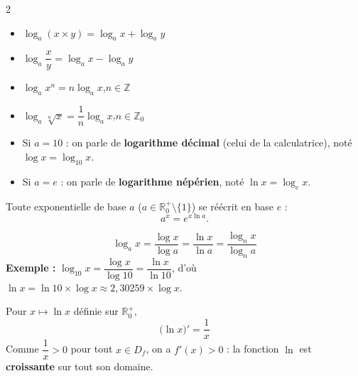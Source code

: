 \documentclass[11pt,a4paper]{article}
\newcommand{\R}{\mathbb{R}}
\newcommand{\Z}{\mathbb{Z}}
\newcommand{\Df}{D_f}
\begin{document}
\begin{tcolorbox}[boxbase,colback=formulacol!6,colframe=formulacol,
    title={\textsc{Propriétés des logarithmes}}]
\begin{multicols}{2}
\begin{itemize}[leftmargin=1.2em,topsep=0pt,itemsep=3pt]
  \item $\log_a(x\times y)=\log_a x+\log_a y$
  \item $\log_a\dfrac{x}{y}=\log_a x-\log_a y$
  \item $\log_a x^{n}=n\log_a x$,\quad $n\in\Z$
  \item $\log_a\sqrt[n]{x}=\dfrac1n\log_a x$,\quad $n\in\Z_0$
\end{itemize}
\end{multicols}
\end{tcolorbox}

\begin{itemize}[leftmargin=1.5em,topsep=2pt,itemsep=2pt]
  \item Si $a=10$ : on parle de \textbf{logarithme décimal} (celui de la calculatrice),
        noté $\log x=\log_{10}x$.
  \item Si $a=e$ : on parle de \textbf{logarithme népérien}, noté $\ln x=\log_e x$.
\end{itemize}

\begin{remarque}
Toute exponentielle de base $a$ ($a\in\R_0^{+}\setminus\{1\}$) se réécrit en base $e$ :
\[
  a^{x}=e^{x\ln a}.
\]
\end{remarque}

\begin{formule}
\[
  \boxed{\;\log_a x=\dfrac{\log x}{\log a}=\dfrac{\ln x}{\ln a}=\dfrac{\log_n x}{\log_n a}\;}
\]
\textbf{Exemple :} $\log_{10}x=\dfrac{\log x}{\log 10}=\dfrac{\ln x}{\ln 10}$, d'où
$\ln x=\ln 10\times\log x\approx 2{,}30259\times\log x$.
\end{formule}

\begin{formule}
Pour $x\mapsto\ln x$ définie sur $\R_0^{+}$,
\[
  \boxed{\;\big(\ln x\big)'=\dfrac1x\;}
\]
Comme $\dfrac1x>0$ pour tout $x\in\Df$, on a $f'(x)>0$ : la fonction $\ln$ est
\textbf{croissante} sur tout son domaine.
\end{formule}
\end{document}
